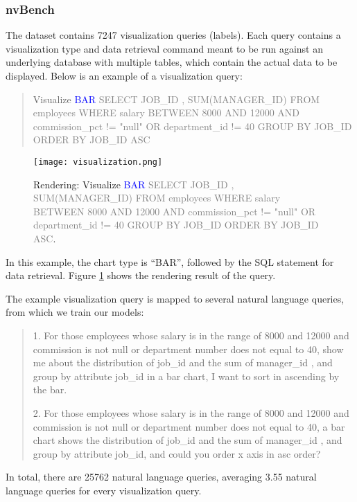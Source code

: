 \documentclass[
	a4paper, %
	10pt, %
	unnumberedsections, %
	twoside, %
]{t0003}
\newcommand{\blue}[1]{\textcolor{blue}{#1}}
\newcommand{\gray}[1]{\textcolor{gray}{#1}}
\begin{document}
\subsubsection{nvBench} The dataset contains 7247 visualization queries (labels). Each query contains a visualization type and data retrieval command meant to be run against an underlying database with multiple tables, which contain the actual data to be displayed. Below is an example of a visualization query:

\begin{quote}
Visualize \blue{BAR} \gray{SELECT JOB\_ID , SUM(MANAGER\_ID) FROM employees WHERE salary BETWEEN 8000 AND 12000 AND commission\_pct != "null" OR department\_id != 40 GROUP BY JOB\_ID ORDER BY JOB\_ID ASC}
\end{quote}

\begin{figure}
	\texttt{[image: visualization.png]}
	\caption{Rendering: Visualize \blue{BAR} \gray{SELECT JOB\_ID , SUM(MANAGER\_ID) FROM employees WHERE salary BETWEEN 8000 AND 12000 AND commission\_pct != "null" OR department\_id != 40 GROUP BY JOB\_ID ORDER BY JOB\_ID ASC}.}
	\label{fig:visualization}
\end{figure}

In this example, the chart type is ``BAR'', followed by the SQL statement for data retrieval. Figure \ref{fig:visualization} shows the rendering result of the query.

The example visualization query is mapped to several natural language queries, from which we train our models:

\begin{quote}
1. For those employees whose salary is in the range of 8000 and 12000 and commission is not null or department number does not equal to 40, show me about the distribution of job\_id and the sum of manager\_id , and group by attribute job\_id in a bar chart, I want to sort in ascending by the bar.

2. For those employees whose salary is in the range of 8000 and 12000 and commission is not null or department number does not equal to 40, a bar chart shows the distribution of job\_id and the sum of manager\_id , and group by attribute job\_id, and could you order x axis in asc order?
\end{quote}

In total, there are 25762 natural language queries, averaging 3.55 natural language queries for every visualization query.
\end{document}
